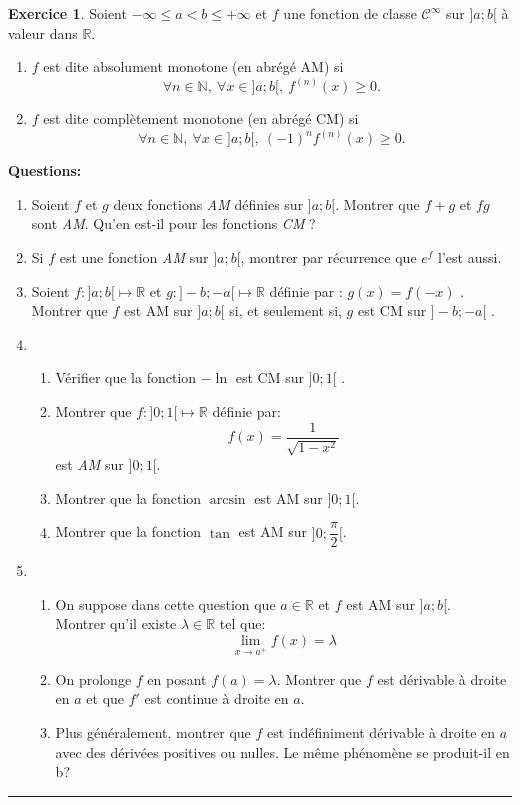 \documentclass[a4paper,10pt]{article}
\theoremstyle{definition}
\theoremstyle{definition}
\newtheorem{exo}{Exercice}
\newcommand{\R}{\mathbb{R}}
\newcommand{\N}{\mathbb{N}}
\begin{document}
\begin{exo}
			Soient $-\infty\leq a<b\leq+\infty$  et $f$ une fonction de classe $\mathcal{C}^{\infty}$ sur $]a;b[$ à valeur dans $\R$.\\[0.25cm]
			\begin{enumerate}[$\square$]
				\item $f$ est dite absolument monotone (en abrégé AM) si
				$$\forall n\in\N, \ \forall x\in ]a;b[, \ f^{(n)}(x)\geq0.  $$
				\item $f$ est dite complètement monotone (en abrégé CM) si
				$$\forall n\in\N, \ \forall x\in ]a;b[, \ (-1)^nf^{(n)}(x)\geq0.  $$
			\end{enumerate}
		\noindent\textbf{\Large{Questions:}}
			\begin{enumerate}
				\item Soient $f$ et $g$ deux fonctions \emph{AM} définies sur $]a;b[$. Montrer que $f+g$ et $fg$
				sont \emph{AM}. Qu’en est-il pour les fonctions \emph{CM} ?
				\item Si $f$ est une fonction \emph{AM} sur $]a;b[$, montrer par récurrence que $e^f$ l’est
				aussi.
				\item Soient $f:]a;b[ \mapsto \R$ et $g:]-b;-a[ \mapsto \R$ définie par : $g(x)=f(-x)$ . Montrer que $f$ est AM sur $]a;b[$ si, et seulement si, $g$ est CM sur $]-b;-a[$ .
				\item\begin{enumerate}
					\item Vérifier que la fonction $-\ln$ est CM sur $]0;1[$ .
					\item Montrer que $f:]0;1[ \mapsto \R$ définie par:
					$$f(x) = \dfrac{1}{\sqrt{1-x^2}}$$
					est \emph{AM} sur $]0;1[$. 
					\item Montrer que la fonction $\arcsin$ est AM sur $]0;1[$.
					\item Montrer que la fonction $\tan$ est AM sur $]0;\dfrac{\pi}{2}[$.
				\end{enumerate}
				\item\begin{enumerate}
					\item On suppose dans cette question que $a\in\R$ et $f$ est AM sur $] a ; b $[.\\ Montrer qu’il existe $\lambda\in\R$ tel que:
					$$\lim\limits_{x\rightarrow a^+}f(x) = \lambda$$
					\item On prolonge $f$ en posant $f ( a ) = \lambda$. Montrer que $f$ est dérivable à droite en $a$ et que $f'$ est continue à droite en $a$.
					\item Plus généralement, montrer que $f$ est indéfiniment dérivable à droite en $a$ avec des dérivées positives ou nulles. Le même phénomène se produit-il en
					b?
				\end{enumerate}
			\end{enumerate}
			
			\centering
			\rule{1\linewidth}{0.6pt}
		\end{exo}
		
\end{document}
